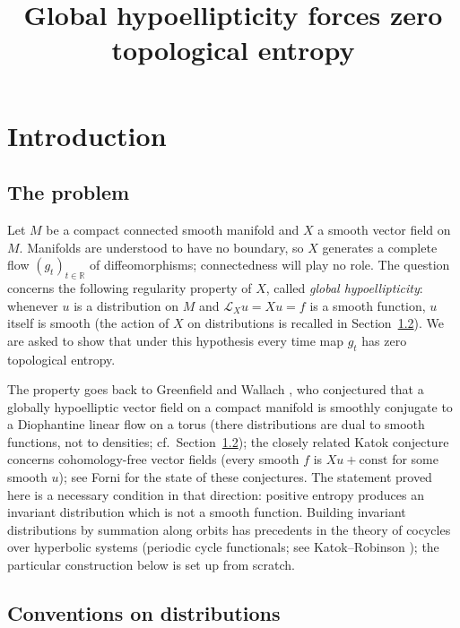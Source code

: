 \documentclass[12pt]{article}
\title{Global hypoellipticity forces zero topological entropy}
\author{}
\date{}
\theoremstyle{remark}
\newcommand{\R}{\mathbb R}
\newcommand{\LX}{\mathcal L_X}
\begin{document}
\maketitle

\section{Introduction}
\label{sec:intro}

\subsection{The problem}

Let \(M\) be a compact connected smooth manifold and \(X\) a smooth
vector field on \(M\).  Manifolds are understood to have no
boundary, so \(X\) generates a complete flow \((g_t)_{t\in\R}\) of
diffeomorphisms; connectedness will play no role.  The question concerns the following regularity
property of \(X\), called \emph{global hypoellipticity}: whenever
\(u\) is a distribution on \(M\) and \(\LX u=Xu=f\) is a smooth
function, \(u\) itself is smooth (the action of \(X\) on
distributions is recalled in Section~\ref{sec:conventions}).  We are
asked to show that under this hypothesis every time map \(g_t\) has
zero topological entropy.

The property goes back to Greenfield and Wallach
\cite{GreenfieldWallach1973}, who conjectured that a globally
hypoelliptic vector field on a compact manifold is smoothly conjugate
to a Diophantine linear flow on a torus (there distributions are
dual to smooth functions, not to densities; cf.\
Section~\ref{sec:conventions}); the closely related Katok
conjecture concerns cohomology-free vector fields (every smooth
\(f\) is \(Xu+\mathrm{const}\) for some smooth \(u\)); see Forni
\cite{Forni2008} for the state of these conjectures.
The statement proved here is a necessary condition in that direction:
positive entropy produces an invariant distribution which is not a
smooth function.
Building invariant distributions by summation along orbits has
precedents in the theory of cocycles over hyperbolic systems
(periodic cycle functionals; see Katok--Robinson
\cite{KatokRobinson2001}); the particular construction below is set
up from scratch.

\subsection{Conventions on distributions}
\label{sec:conventions}
\end{document}
